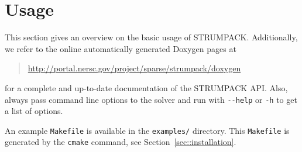 \documentclass{article}
\begin{document}
\section{Usage}\label{sec:usage}
This section gives an overview on the basic usage of
STRUMPACK. Additionally, we refer to the online automatically
generated Doxygen pages at
\begin{quote}
  \url{http://portal.nersc.gov/project/sparse/strumpack/doxygen}
\end{quote}
for a complete and up-to-date documentation of the STRUMPACK
API. Also, always pass command line options to the solver and run with
\lstinline[style=Bash]!--help! or \lstinline[style=Bash]!-h! to get a
list of options.

An example \lstinline[style=Bash]!Makefile! is available in the
\lstinline[style=Bash]!examples/! directory. This
\lstinline[style=Bash]!Makefile! is generated by the
\lstinline[style=Bash]!cmake! command, see
Section~\ref{sec::installation}.
\end{document}
